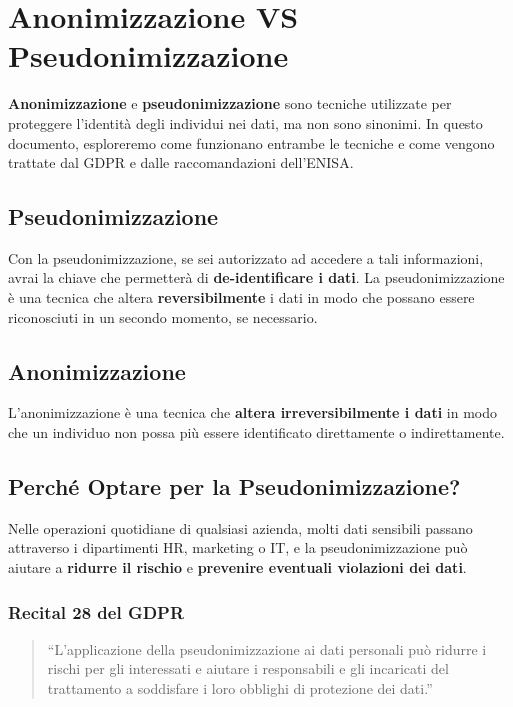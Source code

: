 \chapter{Anonimizzazione VS Pseudonimizzazione}

\textbf{Anonimizzazione} e \textbf{pseudonimizzazione} sono tecniche utilizzate per proteggere l'identità degli individui nei dati, ma non sono sinonimi. In questo documento, esploreremo come funzionano entrambe le tecniche e come vengono trattate dal GDPR e dalle raccomandazioni dell'ENISA.

\section{Pseudonimizzazione}
Con la pseudonimizzazione, se sei autorizzato ad accedere a tali informazioni, avrai la chiave che permetterà di \textbf{de-identificare i dati}. La pseudonimizzazione è una tecnica che altera \textbf{reversibilmente} i dati in modo che possano essere riconosciuti in un secondo momento, se necessario.

\section{Anonimizzazione}
L'anonimizzazione è una tecnica che\textbf{ altera irreversibilmente i dati} in modo che un individuo non possa più essere identificato direttamente o indirettamente. 

\newpage

\section{Perché Optare per la Pseudonimizzazione?}
Nelle operazioni quotidiane di qualsiasi azienda, molti dati sensibili passano attraverso i dipartimenti HR, marketing o IT, e la pseudonimizzazione può aiutare a \textbf{ridurre il rischio} e \textbf{prevenire eventuali violazioni dei dati}.

\subsection{Recital 28 del GDPR}
\begin{quote}
“L'applicazione della pseudonimizzazione ai dati personali può ridurre i rischi per gli interessati e aiutare i responsabili e gli incaricati del trattamento a soddisfare i loro obblighi di protezione dei dati.”
\end{quote}


